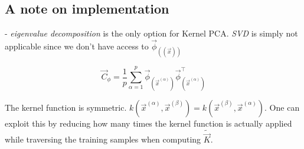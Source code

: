 \subsection{A note on implementation}

\begin{frame}{\subsecname}



\pause

- \emph{eigenvalue decomposition} is the only option for Kernel PCA. \emph{SVD} is simply not applicable since we don't have access to $\vec \phi_{((\vec x))}$

\begin{equation}
\vec C_{\phi} = \frac{1}{p} \sum_{\alpha=1}^{p} \vec{\phi}_{(\vec{x}^{(\alpha)})} \vec{\phi}^{\top}_{(\vec{x}^{(\alpha)})}
\end{equation}

\end{frame}

\begin{frame}{\subsecname}


\pause

The kernel function is symmetric. $k(\vec x^{(\alpha)}, \vec x^{(\beta)}) = k(\vec x^{(\beta)}, \vec x^{(\alpha)})$. One can exploit this by reducing how many times the kernel function is actually applied while traversing the training samples when computing $\widetilde {\vec{K}}$.

\end{frame}

